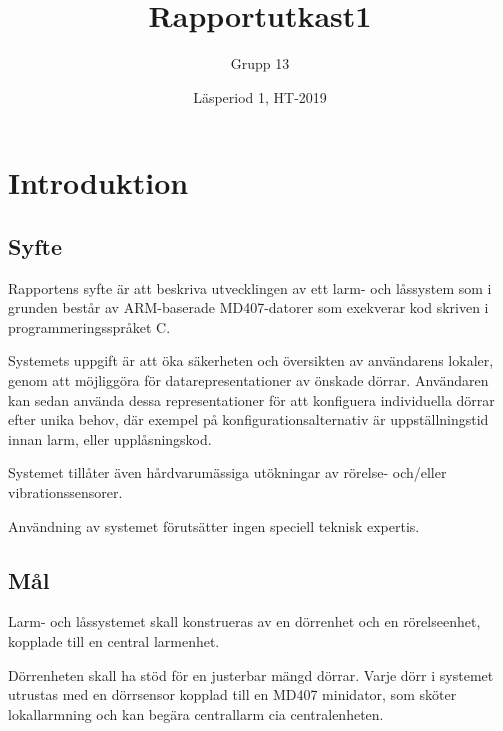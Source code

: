 \documentclass{article}
\title{Rapportutkast1}
\author{Grupp 13}
\date{Läsperiod 1, HT-2019}
\begin{document}
\maketitle
{}
\newpage

\tableofcontents
\newpage



\section{Introduktion}
\subsection{Syfte} %
Rapportens syfte är att beskriva utvecklingen av ett larm- och
 låssystem som i grunden består av ARM-baserade MD407-datorer
  som exekverar kod skriven i programmeringsspråket C.

Systemets uppgift är att öka säkerheten och översikten av
 användarens lokaler, genom att möjliggöra för
 datarepresentationer av önskade dörrar. Användaren
 kan sedan använda dessa representationer för att konfiguera
 individuella dörrar efter unika behov, där exempel på
 konfigurationsalternativ är uppställningstid innan larm,
  eller upplåsningskod.

Systemet tillåter även hårdvarumässiga utökningar av
rörelse- och/eller vibrationssensorer.

Användning av systemet förutsätter ingen speciell
teknisk expertis.

\subsection{Mål} %

Larm- och låssystemet skall konstrueras av en dörrenhet och en rörelseenhet, kopplade till en central larmenhet.

Dörrenheten skall ha stöd för en justerbar mängd dörrar. Varje dörr i systemet utrustas med en dörrsensor kopplad till en MD407 minidator, som sköter lokallarmning och kan begära centrallarm cia centralenheten.
\end{document}
